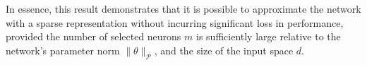 
\begin{remark}
    In essence, this result demonstrates that it is possible to approximate the network with a sparse representation without incurring significant loss in performance, provided the number of selected neurons \( m \) is sufficiently large relative to the network's parameter norm $\|\theta\|_{\mathcal{P}}$, and the size of the input space \( d \).
\end{remark}

